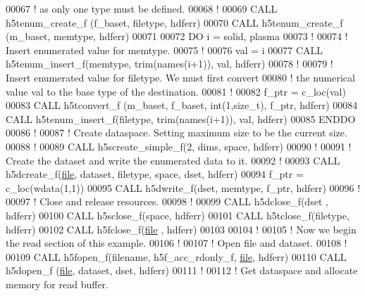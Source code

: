 \begin{DoxyCode}
00067   \textcolor{comment}{! as only one type must be defined.}
00068   \textcolor{comment}{!}
00069   \textcolor{keyword}{CALL }h5tenum\_create\_f (f\_baset, filetype, hdferr)
00070   \textcolor{keyword}{CALL }h5tenum\_create\_f (m\_baset, memtype, hdferr)
00071 
00072   \textcolor{keywordflow}{DO} i = solid, plasma
00073      \textcolor{comment}{!}
00074      \textcolor{comment}{! Insert enumerated value for memtype.}
00075      \textcolor{comment}{!}
00076      val = i
00077      \textcolor{keyword}{CALL }h5tenum\_insert\_f(memtype, trim(names(i+1)), val, hdferr)
00078      \textcolor{comment}{!}
00079      \textcolor{comment}{! Insert enumerated value for filetype.  We must first convert}
00080      \textcolor{comment}{! the numerical value val to the base type of the destination.}
00081      \textcolor{comment}{!}
00082      f\_ptr = c\_loc(val)
00083      \textcolor{keyword}{CALL }h5tconvert\_f (m\_baset, f\_baset, int(1,size\_t), f\_ptr, hdferr)
00084      \textcolor{keyword}{CALL }h5tenum\_insert\_f(filetype, trim(names(i+1)), val, hdferr)
00085 \textcolor{keywordflow}{  ENDDO}
00086   \textcolor{comment}{!}
00087   \textcolor{comment}{! Create dataspace.  Setting maximum size to be the current size.}
00088   \textcolor{comment}{!}
00089   \textcolor{keyword}{CALL }h5screate\_simple\_f(2, dims, space, hdferr)
00090   \textcolor{comment}{!}
00091   \textcolor{comment}{! Create the dataset and write the enumerated data to it.}
00092   \textcolor{comment}{! }
00093   \textcolor{keyword}{CALL }h5dcreate\_f(\hyperlink{structfile}{file}, dataset, filetype, space, dset, hdferr)
00094   f\_ptr = c\_loc(wdata(1,1))
00095   \textcolor{keyword}{CALL }h5dwrite\_f(dset, memtype, f\_ptr, hdferr)
00096   \textcolor{comment}{!}
00097   \textcolor{comment}{! Close and release resources.}
00098   \textcolor{comment}{!}
00099   \textcolor{keyword}{CALL }h5dclose\_f(dset , hdferr)
00100   \textcolor{keyword}{CALL }h5sclose\_f(space, hdferr)
00101   \textcolor{keyword}{CALL }h5tclose\_f(filetype, hdferr)
00102   \textcolor{keyword}{CALL }h5fclose\_f(\hyperlink{structfile}{file} , hdferr)
00103 
00104   \textcolor{comment}{!}
00105   \textcolor{comment}{! Now we begin the read section of this example.}
00106   \textcolor{comment}{!}
00107   \textcolor{comment}{! Open file and dataset.}
00108   \textcolor{comment}{!}
00109   \textcolor{keyword}{CALL }h5fopen\_f(filename, h5f\_acc\_rdonly\_f, \hyperlink{structfile}{file}, hdferr)
00110   \textcolor{keyword}{CALL }h5dopen\_f (\hyperlink{structfile}{file}, dataset, dset, hdferr)
00111   \textcolor{comment}{!}
00112   \textcolor{comment}{! Get dataspace and allocate memory for read buffer.}

\end{DoxyCode}
